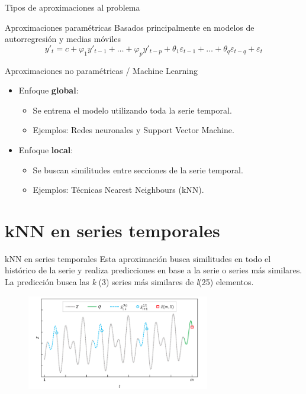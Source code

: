 \documentclass[12pt, aspectratio=169]{beamer} %
\begin{document}
\begin{frame}{Tipos de aproximaciones al problema}
  \begin{block}{Aproximaciones paramétricas}
    Basados principalmente en modelos de autorregresión y medias móviles
    \[ y'_t = c + \varphi_1y'_{t-1} + \ldots + \varphi_py'_{t-p} +
          \theta_1\varepsilon_{t-1} + \ldots + \theta_q\varepsilon_{t-q} + \varepsilon_t\]
  \end{block}

  \begin{block}{Aproximaciones no paramétricas / Machine Learning}
    \begin{itemize}
    \item Enfoque \textbf{global}:
      \begin{itemize}
      \item Se entrena el modelo utilizando toda la serie temporal.
      \item Ejemplos: Redes neuronales y Support Vector Machine.
      \end{itemize}
    \item Enfoque \textbf{local}:
      \begin{itemize}
      \item Se buscan similitudes entre secciones de la serie temporal.
      \item Ejemplos: Técnicas Nearest Neighbours (kNN).
      \end{itemize}
    \end{itemize}

  \end{block}

\end{frame}

\section{kNN en series temporales}

\begin{frame}{kNN en series temporales}
  Esta aproximación busca similitudes en todo el histórico de la serie y realiza predicciones en base a la serie o series más similares.
  La predicción busca las \textit{k} (3) series más similares de \textit{l}(25) elementos. 
  \begin{figure}
  \includegraphics[width=8cm]{20210312_1_knn_summary.png}
  \label{fig:ejemplo_knn_ts}
\end{figure}

\end{frame}
\end{document}
